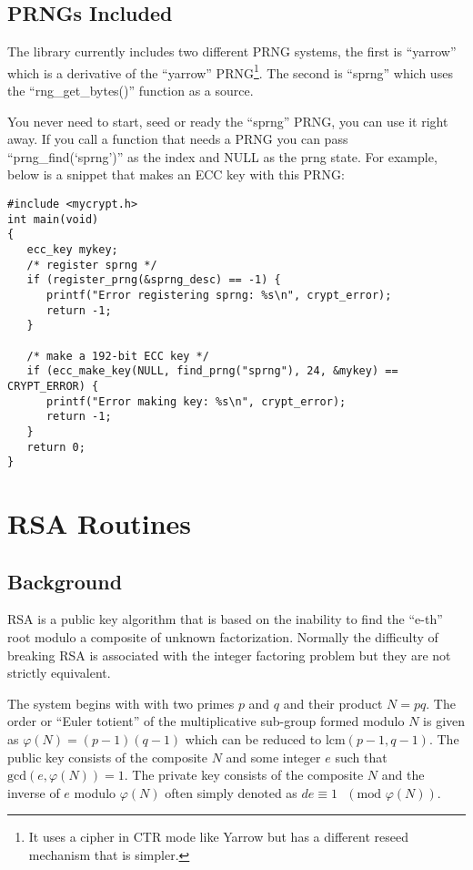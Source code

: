 \documentclass{book}
\def\phi{\varphi}
\begin{document}
\section{PRNGs Included}
The library currently includes two different PRNG systems, the first is ``yarrow'' which is a derivative of the ``yarrow''
PRNG\footnote{It uses a cipher in CTR mode like Yarrow but has a different reseed mechanism that is simpler.}.  The second 
is ``sprng'' which uses the ``rng\_get\_bytes()'' function as a source.

You never need to start, seed or ready the ``sprng'' PRNG, you can use it right away.  If you call a function that needs a 
PRNG  you can pass ``prng\_find(`sprng')'' as the index and NULL as the prng state.  For example, below is a snippet that
makes an ECC key with this PRNG:
\begin{verbatim}
#include <mycrypt.h>
int main(void)
{
   ecc_key mykey;
   /* register sprng */
   if (register_prng(&sprng_desc) == -1) {
      printf("Error registering sprng: %s\n", crypt_error);
      return -1;
   }

   /* make a 192-bit ECC key */
   if (ecc_make_key(NULL, find_prng("sprng"), 24, &mykey) == CRYPT_ERROR) {
      printf("Error making key: %s\n", crypt_error);
      return -1;
   }
   return 0;
}
\end{verbatim}

\chapter{RSA Routines}

\section{Background}

RSA is a public key algorithm that is based on the inability to find the ``e-th'' root modulo a composite of unknown 
factorization.  Normally the difficulty of breaking RSA is associated with the integer factoring problem but they are
not strictly equivalent.

The system begins with with two primes $p$ and $q$ and their product $N = pq$.  The order or ``Euler totient'' of the
multiplicative sub-group formed modulo $N$ is given as $\phi(N) = (p - 1)(q - 1)$ which can be reduced to 
$\mbox{lcm}(p - 1, q - 1)$.  The public key consists of the composite $N$ and some integer $e$ such that 
$\mbox{gcd}(e, \phi(N)) = 1$.  The private key consists of the composite $N$ and the inverse of $e$ modulo $\phi(N)$ 
often simply denoted as $de \equiv 1\mbox{ }(\mbox{mod }\phi(N))$.
\end{document}
